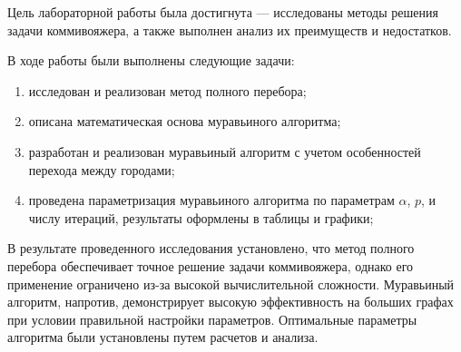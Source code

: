 
\vspace{0.5cm}
Цель лабораторной работы была достигнута — исследованы методы решения задачи коммивояжера, а также выполнен анализ их преимуществ и недостатков. 

\vspace{0.5cm}
В ходе работы были выполнены следующие задачи:
\begin{enumerate}
    \item исследован и реализован метод полного перебора;
    \item описана математическая основа муравьиного алгоритма;
    \item разработан и реализован муравьиный алгоритм с учетом особенностей перехода между городами;
    \item проведена параметризация муравьиного алгоритма по параметрам $\alpha$, $p$, и числу итераций, результаты оформлены в таблицы и графики;
\end{enumerate}

\vspace{0.5cm}
В результате проведенного исследования установлено, что метод полного перебора обеспечивает точное решение задачи коммивояжера, однако его применение ограничено из-за высокой вычислительной сложности. Муравьиный алгоритм, напротив, демонстрирует высокую эффективность на больших графах при условии правильной настройки параметров. Оптимальные параметры алгоритма были установлены путем расчетов и анализа.


